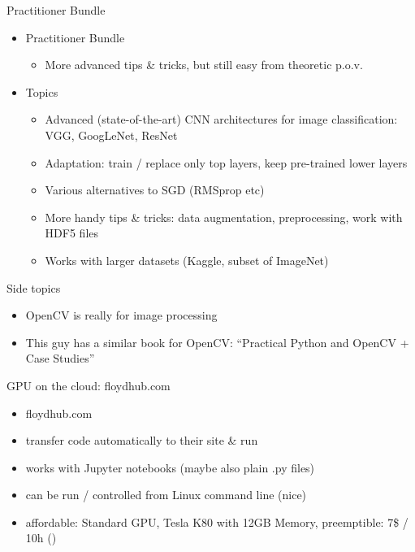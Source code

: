 \documentclass[ignorenonframetext,]{beamer}
\providecommand{\tightlist}{%
  \setlength{\itemsep}{0pt}\setlength{\parskip}{0pt}}
\begin{document}
\begin{frame}{Practitioner Bundle}

\begin{itemize}
\tightlist
\item
  Practitioner Bundle

  \begin{itemize}
  \tightlist
  \item
    More advanced tips \& tricks, but still easy from theoretic p.o.v.
  \end{itemize}
\item
  Topics

  \begin{itemize}
  \tightlist
  \item
    Advanced (state-of-the-art) CNN architectures for image
    classification: VGG, GoogLeNet, ResNet\\
  \item
    Adaptation: train / replace only top layers, keep pre-trained lower
    layers
  \item
    Various alternatives to SGD (RMSprop etc)
  \item
    More handy tips \& tricks: data augmentation, preprocessing, work
    with HDF5 files
  \item
    Works with larger datasets (Kaggle, subset of ImageNet)
  \end{itemize}
\end{itemize}

\end{frame}

\begin{frame}{Side topics}

\begin{itemize}
\tightlist
\item
  OpenCV is really for image processing
\item
  This guy has a similar book for OpenCV: ``Practical Python and OpenCV
  + Case Studies''
\end{itemize}

\end{frame}

\begin{frame}{GPU on the cloud: floydhub.com}

\begin{itemize}
\tightlist
\item
  floydhub.com
\item
  transfer code automatically to their site \& run
\item
  works with Jupyter notebooks (maybe also plain .py files)
\item
  can be run / controlled from Linux command line (nice)
\item
  affordable: Standard GPU, Tesla K80 with 12GB Memory, preemptible: 7\$
  / 10h ()
\end{itemize}

\end{frame}
\end{document}
